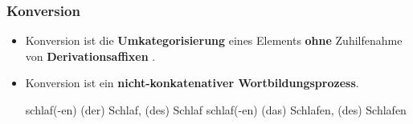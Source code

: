 \begin{frame}
\frametitle{Konversion}

\begin{itemize}
\item Konversion ist die \textbf{Umkategorisierung} eines Elements \textbf{ohne} Zuhilfenahme von \textbf{Derivationsaffixen} .

\item Konversion ist ein \textbf{nicht-konkatenativer Wortbildungsprozess}.

\eal 
\ex {}schlaf(-en) \ras (der) Schlaf, (des) Schlaf
\ex {}schlaf(-en) \ras (das) Schlafen, (des) Schlafen
\zl

\end{itemize}

\end{frame}


